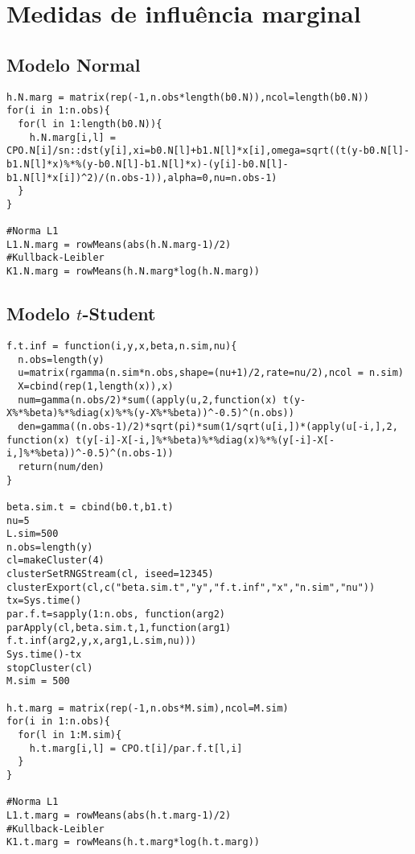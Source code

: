 \section{Medidas de influência marginal}
\subsection{Modelo Normal}
\begin{lstlisting}
h.N.marg = matrix(rep(-1,n.obs*length(b0.N)),ncol=length(b0.N))
for(i in 1:n.obs){
  for(l in 1:length(b0.N)){
    h.N.marg[i,l] = CPO.N[i]/sn::dst(y[i],xi=b0.N[l]+b1.N[l]*x[i],omega=sqrt((t(y-b0.N[l]-b1.N[l]*x)%*%(y-b0.N[l]-b1.N[l]*x)-(y[i]-b0.N[l]-b1.N[l]*x[i])^2)/(n.obs-1)),alpha=0,nu=n.obs-1)
  }
}

#Norma L1
L1.N.marg = rowMeans(abs(h.N.marg-1)/2)
#Kullback-Leibler
K1.N.marg = rowMeans(h.N.marg*log(h.N.marg))
\end{lstlisting}

\subsection{Modelo $t$-Student}
\begin{lstlisting}
f.t.inf = function(i,y,x,beta,n.sim,nu){
  n.obs=length(y)
  u=matrix(rgamma(n.sim*n.obs,shape=(nu+1)/2,rate=nu/2),ncol = n.sim)
  X=cbind(rep(1,length(x)),x)
  num=gamma(n.obs/2)*sum((apply(u,2,function(x) t(y-X%*%beta)%*%diag(x)%*%(y-X%*%beta))^-0.5)^(n.obs))
  den=gamma((n.obs-1)/2)*sqrt(pi)*sum(1/sqrt(u[i,])*(apply(u[-i,],2, function(x) t(y[-i]-X[-i,]%*%beta)%*%diag(x)%*%(y[-i]-X[-i,]%*%beta))^-0.5)^(n.obs-1))
  return(num/den)
}

beta.sim.t = cbind(b0.t,b1.t)
nu=5
L.sim=500
n.obs=length(y)
cl=makeCluster(4)
clusterSetRNGStream(cl, iseed=12345)
clusterExport(cl,c("beta.sim.t","y","f.t.inf","x","n.sim","nu"))
tx=Sys.time()
par.f.t=sapply(1:n.obs, function(arg2) parApply(cl,beta.sim.t,1,function(arg1) f.t.inf(arg2,y,x,arg1,L.sim,nu)))
Sys.time()-tx
stopCluster(cl)
M.sim = 500

h.t.marg = matrix(rep(-1,n.obs*M.sim),ncol=M.sim)
for(i in 1:n.obs){
  for(l in 1:M.sim){
    h.t.marg[i,l] = CPO.t[i]/par.f.t[l,i]
  }
}

#Norma L1
L1.t.marg = rowMeans(abs(h.t.marg-1)/2)
#Kullback-Leibler
K1.t.marg = rowMeans(h.t.marg*log(h.t.marg))
\end{lstlisting}

